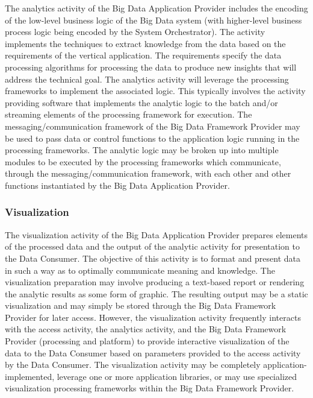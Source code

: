 \documentclass[11pt]{article}
\begin{document}
The analytics activity of the Big Data Application Provider includes the encoding of the low-level 
business logic of the Big Data system (with higher-level business process logic being encoded by the 
System Orchestrator). The activity implements the techniques to extract knowledge from the data based 
on the requirements of the vertical application. The requirements specify the data processing algorithms 
for processing the data to produce new insights that will address the technical goal. The analytics activity 
will leverage the processing frameworks to implement the associated logic. This typically involves the 
activity providing software that implements the analytic logic to the batch and/or streaming elements of 
the processing framework for execution. The messaging/communication framework of the Big Data 
Framework Provider may be used to pass data or control functions to the application logic running in the 
processing frameworks. The analytic logic may be broken up into multiple modules to be executed by the 
processing frameworks which communicate, through the messaging/communication framework, with 
each other and other functions instantiated by the Big Data Application Provider.

\subsubsection{Visualization}

The visualization activity of the Big Data Application Provider prepares elements of the processed data 
and the output of the analytic activity for presentation to the Data Consumer. The objective of this activity 
is to format and present data in such a way as to optimally communicate meaning and knowledge. The 
visualization preparation may involve producing a text-based report or rendering the analytic results as 
some form of graphic. The resulting output may be a static visualization and may simply be stored 
through the Big Data Framework Provider for later access. However, the visualization activity frequently 
interacts with the access activity, the analytics activity, and the Big Data Framework Provider (processing 
and platform) to provide interactive visualization of the data to the Data Consumer based on parameters 
provided to the access activity by the Data Consumer. The visualization activity may be completely 
application-implemented, leverage one or more application libraries, or may use specialized visualization 
processing frameworks within the Big Data Framework Provider. 
\end{document}

